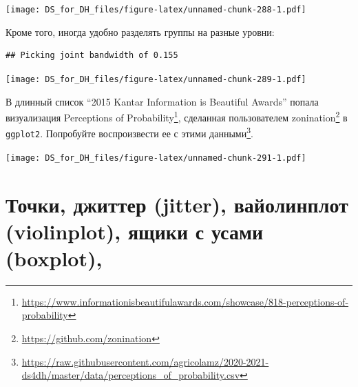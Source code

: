 \documentclass[
]{book}
\makeatletter
\newenvironment{Shaded}{\begin{snugshade}}{\end{snugshade}}
\newcommand{\CommentTok}[1]{\textcolor[rgb]{0.56,0.35,0.01}{\textit{#1}}}
\newcommand{\DataTypeTok}[1]{\textcolor[rgb]{0.13,0.29,0.53}{#1}}
\newcommand{\FloatTok}[1]{\textcolor[rgb]{0.00,0.00,0.81}{#1}}
\newcommand{\KeywordTok}[1]{\textcolor[rgb]{0.13,0.29,0.53}{\textbf{#1}}}
\newcommand{\NormalTok}[1]{#1}
\newcommand{\OperatorTok}[1]{\textcolor[rgb]{0.81,0.36,0.00}{\textbf{#1}}}
\newcommand{\StringTok}[1]{\textcolor[rgb]{0.31,0.60,0.02}{#1}}
\renewcommand{\href}[2]{#2\footnote{\url{#1}}}
\newenvironment{kframe}{%
    \medskip{}
    \setlength{\fboxsep}{.8em}
    \def\at@end@of@kframe{}%
    \ifinner\ifhmode%
    \def\at@end@of@kframe{\end{minipage}}%
    \begin{minipage}{\columnwidth}%
    \fi\fi%
    \def\FrameCommand##1{\hskip\@totalleftmargin \hskip-\fboxsep
    \colorbox{shadecolor}{##1}\hskip-\fboxsep
        \hskip-\linewidth \hskip-\@totalleftmargin \hskip\columnwidth}%
    \MakeFramed {\advance\hsize-\width
      \@totalleftmargin\z@ \linewidth\hsize
      \@setminipage}}%
  {\par\unskip\endMakeFramed%
    \at@end@of@kframe}
\newenvironment{rmdblock}[1]
  {
    \begin{itemize}
    \renewcommand{\labelitemi}{
      \raisebox{-.7\height}[0pt][0pt]{
        {\setkeys{Gin}{width=3em,keepaspectratio}\texttt{[image: images/\#1]}}
        }
        }
        \setlength{\fboxsep}{1em}
        \begin{kframe}
        \item
      }
      {
        \end{kframe}
        \end{itemize}
      }
\newenvironment{rmdtask}
      {\begin{rmdblock}{task}}
      {\end{rmdblock}}
\makeatother
\begin{document}
\texttt{[image: DS\_for\_DH\_files/figure-latex/unnamed-chunk-288-1.pdf]}

Кроме того, иногда удобно разделять группы на разные уровни:

\begin{Shaded}
\end{Shaded}

\begin{verbatim}
## Picking joint bandwidth of 0.155
\end{verbatim}

\texttt{[image: DS\_for\_DH\_files/figure-latex/unnamed-chunk-289-1.pdf]}

\begin{rmdtask}
В длинный список ``2015 Kantar Information is Beautiful Awards'' попала
\href{https://www.informationisbeautifulawards.com/showcase/818-perceptions-of-probability}{визуализация
Perceptions of Probability}, сделанная пользователем
\href{https://github.com/zonination}{zonination} в \texttt{ggplot2}.
Попробуйте воспроизвести ее
\href{https://raw.githubusercontent.com/agricolamz/2020-2021-ds4dh/master/data/perceptions_of_probability.csv}{с
этими данными}.
\end{rmdtask}

\texttt{[image: DS\_for\_DH\_files/figure-latex/unnamed-chunk-291-1.pdf]}

\hypertarget{ux442ux43eux447ux43aux438-ux434ux436ux438ux442ux442ux435ux440-jitter-ux432ux430ux439ux43eux43bux438ux43dux43fux43bux43eux442-violinplot-ux44fux449ux438ux43aux438-ux441-ux443ux441ux430ux43cux438-boxplot}{%
\section{Точки, джиттер (jitter), вайолинплот (violinplot), ящики с усами (boxplot),}\label{ux442ux43eux447ux43aux438-ux434ux436ux438ux442ux442ux435ux440-jitter-ux432ux430ux439ux43eux43bux438ux43dux43fux43bux43eux442-violinplot-ux44fux449ux438ux43aux438-ux441-ux443ux441ux430ux43cux438-boxplot}}
\end{document}
